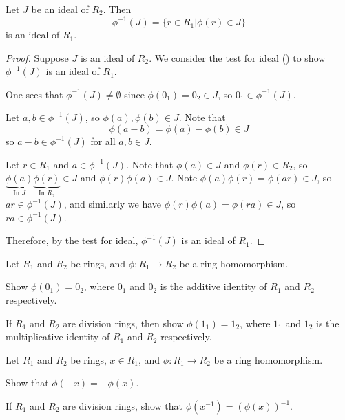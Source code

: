 \begin{proposition}\label{prop-inverse-homomorphism-on-ideal-is-ideal}
    Let $J$ be an ideal of $R_2$. Then
    \[
        \phi^{-1}(J) = \{r \in R_1 \vert \phi(r) \in J\}
    \]
    is an ideal of $R_1$.
\end{proposition}
\begin{proof}
    Suppose $J$ is an ideal of $R_2$. We consider the test for ideal () to show $\phi^{-1}(J)$ is an ideal of $R_1$.

    One sees that $\phi^{-1}(J) \neq \emptyset$ since $\phi(0_1) = 0_2 \in J$, so $0_1 \in \phi^{-1}(J)$.

    Let $a, b \in \phi^{-1}(J)$, so $\phi(a), \phi(b) \in J$. Note that
    \[
        \phi(a-b) = \phi(a) - \phi(b) \in J
    \]
    so $a-b \in \phi^{-1}(J)$ for all $a,b \in J$.

    Let $r \in R_1$ and $a \in \phi^{-1}(J)$. Note that $\phi(a) \in J$ and $\phi(r) \in R_2$, so $\underbrace{\phi(a)}_{\text{In }J}\underbrace{\phi(r)}_{\text{In }R_2} \in J$ and $\phi(r)\phi(a) \in J$. Note $\phi(a)\phi(r) = \phi(ar) \in J$, so $ar \in \phi^{-1}(J)$, and similarly we have $\phi(r)\phi(a) = \phi(ra) \in J$, so $ra \in \phi^{-1}(J)$.

    Therefore, by the test for ideal, $\phi^{-1}(J)$ is an ideal of $R_1$.
\end{proof}

\begin{exercise}\label{exercise-ring-image-of-identity-is-identity}
    Let $R_1$ and $R_2$ be rings, and $\phi: R_1 \to R_2$ be a ring homomorphism.
    \begin{partquestions}{\alph*}
        \item Show $\phi(0_1) = 0_2$, where $0_1$ and $0_2$ is the additive identity of $R_1$ and $R_2$ respectively.
        \item If $R_1$ and $R_2$ are division rings, then show $\phi(1_1) = 1_2$, where $1_1$ and $1_2$ is the multiplicative identity of $R_1$ and $R_2$ respectively.
    \end{partquestions}
\end{exercise}

\begin{exercise}\label{exercise-ring-image-of-inverse-is-inverse}
    Let $R_1$ and $R_2$ be rings, $x \in R_1$, and $\phi: R_1 \to R_2$ be a ring homomorphism.
    \begin{partquestions}{\alph*}
        \item Show that $\phi(-x) = -\phi(x)$.
        \item If $R_1$ and $R_2$ are division rings, show that $\phi(x^{-1}) = (\phi(x))^{-1}$.
    \end{partquestions}
\end{exercise}

